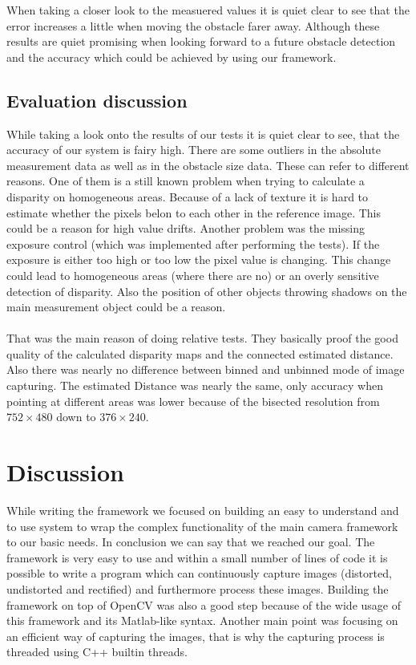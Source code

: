 \documentclass[11pt]{article}
\begin{document}
When taking a closer look to the measuered values it is quiet clear to see that the error increases a little when moving the obstacle farer away.
Although these results are quiet promising when looking forward to a future obstacle detection and the accuracy which could be achieved by using our framework.

\subsection{Evaluation discussion}
While taking a look onto the results of our tests it is quiet clear to see, that the accuracy of our system is fairy high. There are some outliers in the absolute measurement data as well as in the obstacle size data. These can refer to different reasons. One of them is a still known problem when trying to calculate a disparity on homogeneous areas. Because of a lack of texture it is hard to estimate whether the pixels belon to each other in the reference image. This could be a reason for high value drifts. Another problem was the missing exposure control (which was implemented after performing the tests). If the exposure is either too high or too low the pixel value is changing. This change could lead to homogeneous areas (where there are no) or an overly sensitive detection of disparity. Also the position of other objects throwing shadows on the main measurement object could be a reason. \\\\
That was the main reason of doing relative tests. They basically proof the good quality of the calculated disparity maps and the connected estimated distance. Also there was nearly no difference between binned and unbinned mode of image capturing. The estimated Distance was nearly the same, only accuracy when pointing at different areas was lower because of the bisected resolution from $752\times480$ down to $376\times240$.

\section{Discussion}
While writing the framework we focused on building an easy to understand and to use system to wrap the complex functionality of the main camera framework to our basic needs. In conclusion we can say that we reached our goal. The framework is very easy to use and within a small number of lines of code it is possible to write a program which can continuously capture images (distorted, undistorted and rectified) and furthermore process these images. Building the framework on top of OpenCV was also a good step because of the wide usage of this framework and its Matlab-like syntax. Another main point was focusing on an efficient way of capturing the images, that is why the capturing process is threaded using C++ builtin threads.
\end{document}
